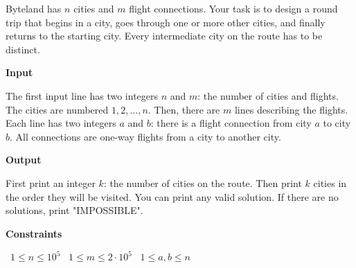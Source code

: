 Byteland has $n$ cities and $m$ flight connections. Your task is to design a round trip that begins in a city, goes through one or more other cities, and finally returns to the starting city. Every intermediate city on the route has to be distinct.

\vspace{0.3cm}\noindent\textbf{Input}

The first input line has two integers $n$ and $m$: the number of cities and flights. The cities are numbered $1,2,\dots,n$.
Then, there are $m$ lines describing the flights. Each line has two integers $a$ and $b$: there is a flight connection from city $a$ to city $b$. All connections are one-way flights from a city to another city.

\vspace{0.3cm}\noindent\textbf{Output}

First print an integer $k$: the number of cities on the route. Then print $k$ cities in the order they will be visited. You can print any valid solution.
If there are no solutions, print "IMPOSSIBLE".

\vspace{0.3cm}\noindent\textbf{Constraints}

\textbullet\ $1 \le n \le 10^5$
\textbullet\ $1 \le m \le 2 \cdot 10^5$
\textbullet\ $1 \le a,b \le n$